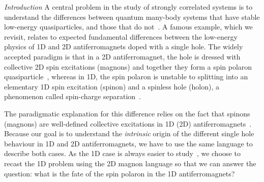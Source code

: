 \documentclass[%
 reprint,
 amsmath,amssymb,
 aps,
prl,
]{revtex4-1}
\begin{document}
{\it Introduction}  A central problem in the study of strongly correlated systems  is to understand the differences between quantum many-body systems that have stable low-energy quasiparticles, and those that do not~\cite{Khomskii2010, Zaanen2019, Kumar2021, Lauchli2004, Ver19}. A famous example, which we revisit, relates to expected fundamental differences between the low-energy physics of 1D and 2D antiferromagnets doped with a single hole. The widely accepted paradigm is that in a 2D antiferromagnet, the hole is dressed with collective 2D spin excitations (magnons) and together they form a spin polaron quasiparticle~\cite{Bul68, Sch88, Mar91, Gru18, Chi18, Koepsell2019, Koepsell2021, Wang2021, Bohrdt2021_01}, whereas in 1D, the spin polaron is unstable to splitting into an elementary 1D spin excitation (spinon) and a spinless hole (holon), a phenomenon called  spin-charge separation~\cite{Lieb1968, Voi95, Kim96, Kim1997, Fujisawa1999, Poilblanc2006, Koitzsch2006, Kim06, Jayadev2020}. 

The paradigmatic explanation for this difference relies on the fact that spinons (magnons) are well-defined collective excitations in 1D (2D) antiferromagnets~\cite{Khomskii2010}. Because our goal is to understand the \textit{intrinsic} origin of the different single hole behaviour in 1D and 2D antiferromagnets, we have to use the same language to describe both cases. As the 1D case is always easier to study~\cite{Giamarchi2003}, we choose to recast the 1D problem using the 2D magnon language so that we can answer the question: what is the fate of the spin polaron in the 1D antiferromagnets?
\end{document}
